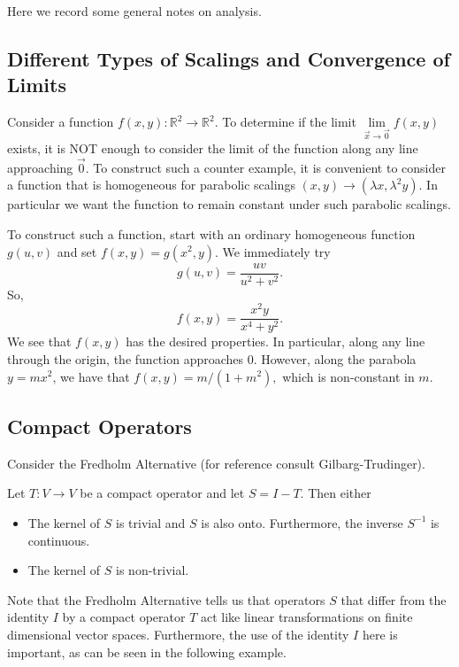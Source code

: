 Here we record some general notes on analysis.

\subsection{Different Types of Scalings and Convergence of Limits} \label{sub:limits}

Consider a function \(f(x,y) : \mathbb R^2 \to \mathbb R^2\). To determine if the limit \(\lim\limits_{\vec x\to\vec0} f(x,y)\) exists, it is NOT enough to consider the limit of the function along any line approaching \(\vec 0\). To construct such a counter example, it is convenient to consider a function that is homogeneous for parabolic scalings \((x,y) \to (\lambda x, \lambda^2 y)\). In particular we want the function to remain constant under such parabolic scalings.

To construct such a function, start with an ordinary homogeneous function \(g(u,v)\) and set \(f(x,y) = g(x^2, y)\). We immediately try
\[
	g(u,v) = \frac{uv}{u^2 + v^2}.
\]
So,
\[
	f(x,y) = \frac{x^2 y}{x^4 + y^2}.
\]
We see that \(f(x,y)\) has the desired properties. In particular, along any line through the origin, the function approaches \(0\). However, along the parabola \(y = mx^2\), we have that \(f(x,y) = m/(1+m^2),\) which is non-constant in \(m\).

\subsection{Compact Operators}

Consider the Fredholm Alternative (for reference consult Gilbarg-Trudinger).

\begin{theorem}
	Let \(T: V \to V\) be a compact operator and let \(S = I - T\). Then either
	\begin{itemize}
		\item The kernel of \(S\) is trivial and \(S\) is also onto. Furthermore, the inverse \(S^{-1}\) is continuous.
		\item The kernel of \(S\) is non-trivial.
	\end{itemize}

\end{theorem}

Note that the Fredholm Alternative tells us that operators \(S\) that differ from the identity \(I\) by a compact operator \(T\) act like linear transformations on finite dimensional vector spaces. Furthermore, the use of the identity \(I\) here is important, as can be seen in the following example.

